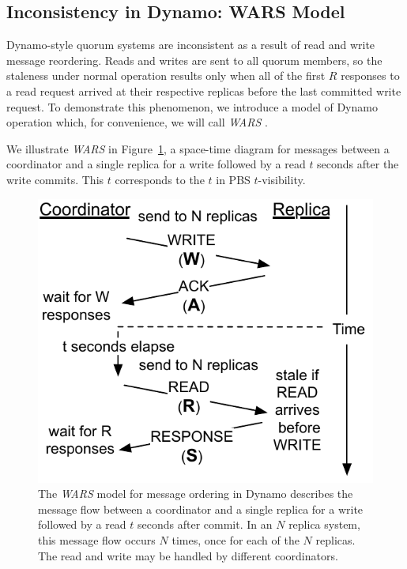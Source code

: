 \documentclass{vldb}
\begin{document}
\subsection{Inconsistency in Dynamo: WARS Model}

Dynamo-style quorum systems are inconsistent as a result of read and
write message reordering.  Reads and writes are sent to all quorum
members, so the staleness under normal operation results only when all
of the first $R$ responses to a read request arrived at their
respective replicas before the last committed write request.  To
demonstrate this phenomenon, we introduce a model of Dynamo operation
which, for convenience, we will call \textit{WARS} .

We illustrate \textit{WARS} in Figure~\ref{fig:dynamo-diagram}, a
space-time diagram for messages between a coordinator and a single
replica for a write followed by a read $t$ seconds after the write
commits.  This $t$ corresponds to the $t$ in PBS $t$-visibility.

\begin{figure}
\centering
\includegraphics[width=.8\columnwidth]{figs/dynamostale.pdf}
\vspace{-8pt}
\caption{The \textit{WARS} model for message ordering in Dynamo
  describes the message flow between a coordinator and a single
  replica for a write followed by a read $t$ seconds after commit.  In
  an $N$ replica system, this message flow occurs $N$ times, once for
  each of the $N$ replicas.  The read and write may be handled by
  different coordinators.}
\vspace{-12pt}
\label{fig:dynamo-diagram}
\end{figure}
\end{document}
